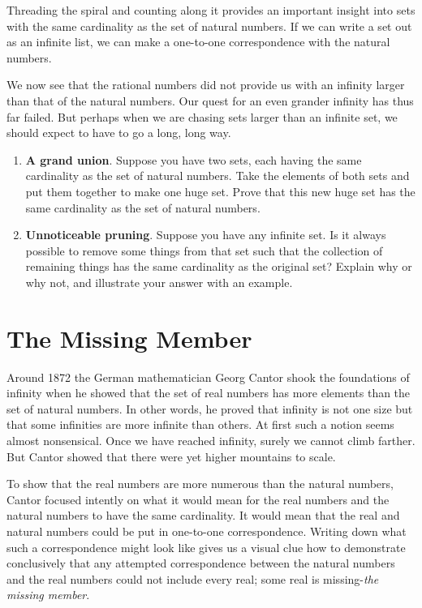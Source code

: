Threading the spiral and counting along it provides an important insight into sets with the same cardinality as the set of natural numbers. If we can write a set out as an infinite list, we can make a one-to-one correspondence with the natural numbers.

We now see that the rational numbers did not provide us with an infinity larger than that of the natural numbers. Our quest for an even grander infinity has thus far failed. But perhaps when we are chasing sets larger than an infinite set, we should expect to have to go a long, long way.

\begin{enumerate}
	\item \textbf{A grand union}. Suppose you have two sets, each having the same
cardinality as the set of natural numbers. Take the elements of both
sets and put them together to make one huge set. Prove that this
new huge set has the same cardinality as the set of natural numbers. \vfill
\item \textbf{ Unnoticeable pruning}. Suppose you have any infinite set. Is it
always possible to remove some things from that set such that the
collection of remaining things has the same cardinality as the original
set? Explain why or why not, and illustrate your answer with an
example.\vfill
\end{enumerate}

\clearpage

%
\section{The Missing Member}  \label{sec:MissingMember}\solnsfalse

Around 1872 the German mathematician Georg Cantor shook the foundations of infinity when he showed that the set of real numbers has more elements than the set of natural numbers. In other words, he proved that infinity is not one size but that some infinities are more infinite than others. At first such a notion seems almost nonsensical. Once we have reached infinity, surely we cannot climb farther. But Cantor showed that there were yet higher mountains to scale.

To show that the real numbers are more numerous than the natural numbers, Cantor focused intently on what it would mean for the real numbers and the natural numbers to have the same cardinality. It would mean that the real and natural numbers could be put in one-to-one correspondence. Writing down what such a correspondence might look like gives us a visual clue how to demonstrate conclusively that any attempted correspondence between the natural numbers and the real numbers could not include every real; some real is missing-\emph{the missing member}.

